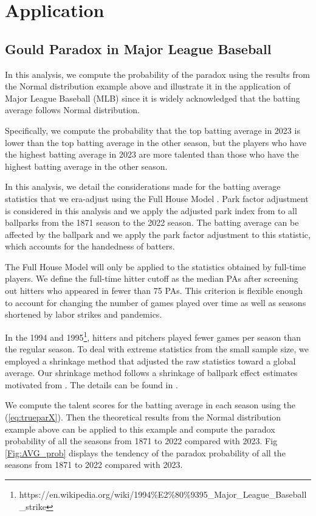 \documentclass[12pt]{article}
\begin{document}
\section{Application}


\subsection{Gould Paradox in Major League Baseball}

In this analysis, we compute the probability of the paradox using the results from the Normal distribution example above and illustrate it in the application of Major League Baseball (MLB) since it is widely acknowledged that the batting average follows Normal distribution. 

Specifically, we compute the probability that the top batting average in 2023 is lower than the top batting average in the other season, but the players who have the highest batting average in 2023 are more talented than those who have the highest batting average in the other season. 

In this analysis, we detail the considerations made for the batting average statistics that we era-adjust using the Full House Model \citep{DE20b}. Park factor adjustment is considered in this analysis and we apply the adjusted park index from \cite{SM16} to all ballparks from the 1871 season to the 2022 season. The batting average can be affected by the ballpark and we apply the park factor adjustment to this statistic, which accounts for the handedness of batters.

The Full House Model will only be applied to the statistics obtained by full-time players. We define the full-time hitter cutoff as the median PAs after screening out hitters who appeared in fewer than 75 PAs. This criterion is flexible enough to account for changing the number of games played over time as well as seasons shortened by labor strikes and pandemics.

In the 1994 and 1995\footnote{https://en.wikipedia.org/wiki/1994\%E2\%80\%9395\_Major\_League\_Baseball\_strike}, hitters and pitchers played fewer games per season than the regular season. To deal with extreme statistics from the small sample size, we employed a shrinkage method that adjusted the raw statistics toward a global average. Our shrinkage method follows a shrinkage of ballpark effect estimates motivated from \cite{SM16}. The details can be found in \cite{DE20b}.

We compute the talent scores for the batting average in each season using the (\ref{eq:trueparX}). Then the theoretical results from the Normal distribution example above can be applied to this example and compute the paradox probability of all the seasons from 1871 to 2022 compared with 2023. Fig \ref{Fig:AVG_prob} displays the tendency of the paradox probability of all the seasons from 1871 to 2022 compared with 2023.
\end{document}
